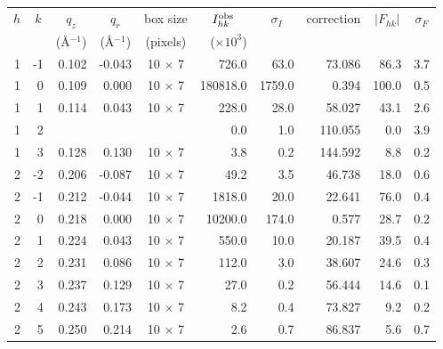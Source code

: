 \begin{table}[htbp]
  \centering
  \begin{tabular}{rrrrcrrrrr}
    \hline
    \multicolumn{1}{c}{$h$} & \multicolumn{1}{c}{$k$} & \multicolumn{1}{c}{$q_z$} & 
    \multicolumn{1}{c}{$q_r$} & \multicolumn{1}{c}{box size} & \multicolumn{1}{c}{$I_{hk}^\textrm{obs}$} & 
    \multicolumn{1}{c}{$\sigma_I$} & \multicolumn{1}{c}{correction} & \multicolumn{1}{c}{$|F_{hk}|$} &
    \multicolumn{1}{c}{$\sigma_F$} \\
     & & \multicolumn{1}{c}{(\AA$^{-1}$)} & \multicolumn{1}{c}{(\AA$^{-1}$)} & \multicolumn{1}{c}{(pixels)} & ($\times 10^3$) & & & \\ 
    \hline
  1        & -1       & 0.102    & -0.043   & 10 $\times$ 7 & 726.0    & 63.0     & 73.086    & 86.3     & 3.7 \\
  1        & 0        & 0.109    & 0.000    & 10 $\times$ 7 & 180818.0 & 1759.0   & 0.394     & 100.0    & 0.5 \\
  1        & 1        & 0.114    & 0.043    & 10 $\times$ 7 & 228.0    & 28.0     & 58.027    & 43.1     & 2.6 \\
  1        & 2        &          &          &             & 0.0        & 1.0      & 110.055   & 0.0      & 3.9 \\
  1        & 3        & 0.128    & 0.130    & 10 $\times$ 7 & 3.8      & 0.2      & 144.592   & 8.8      & 0.2 \\
  2        & -2       & 0.206    & -0.087   & 10 $\times$ 7 & 49.2     & 3.5      & 46.738    & 18.0     & 0.6 \\
  2        & -1       & 0.212    & -0.044   & 10 $\times$ 7 & 1818.0   & 20.0     & 22.641    & 76.0     & 0.4 \\
  2        & 0        & 0.218    & 0.000    & 10 $\times$ 7 & 10200.0  & 174.0    & 0.577     & 28.7     & 0.2 \\
  2        & 1        & 0.224    & 0.043    & 10 $\times$ 7 & 550.0    & 10.0     & 20.187    & 39.5     & 0.4 \\
  2        & 2        & 0.231    & 0.086    & 10 $\times$ 7 & 112.0    & 3.0      & 38.607    & 24.6     & 0.3 \\
  2        & 3        & 0.237    & 0.129    & 10 $\times$ 7 & 27.0     & 0.2      & 56.444    & 14.6     & 0.1 \\
  2        & 4        & 0.243    & 0.173    & 10 $\times$ 7 & 8.2      & 0.4      & 73.827    & 9.2      & 0.2 \\
  2        & 5        & 0.250    & 0.214    & 10 $\times$ 7 & 2.6      & 0.7      & 86.837    & 5.6      & 0.7 \\

\end{tabular}
\end{table}

